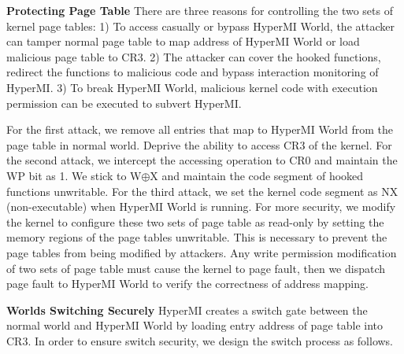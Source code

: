 \documentclass[conference]{IEEEtran}
\begin{document}
\textbf{Protecting Page Table}
There are three reasons for controlling the two sets of kernel page tables: 1) To access casually or bypass HyperMI World, the attacker can tamper normal page table to map address of HyperMI World or load malicious page table to CR3.
2) The attacker can cover the hooked functions, redirect the functions to malicious code and bypass interaction monitoring of HyperMI. 3) To break HyperMI World, malicious kernel code with execution permission can be executed to subvert HyperMI.

For the first attack, %
we remove all entries that map to HyperMI World from the page table in normal world. Deprive the ability to access CR3 of the kernel. %
For the second attack, we intercept the accessing operation to CR0 and maintain the WP bit as 1. We stick to W$\oplus${X} and maintain the code segment of hooked functions unwritable.
For the third attack, we set the kernel code segment as NX (non-executable) when HyperMI World is running. For more security, we modify the kernel to configure these two sets of page table as read-only by setting the memory regions of the page tables unwritable. This is necessary to prevent the page tables from being modified by attackers. Any write permission modification of two sets of page table must cause the kernel to page fault, then we dispatch page fault to HyperMI World to verify the correctness of address mapping. 


\textbf{Worlds Switching Securely}
HyperMI creates a switch gate between the normal world and HyperMI World by loading entry address of page table into CR3.
In order to ensure switch security, we design the switch process as follows.
\end{document}
